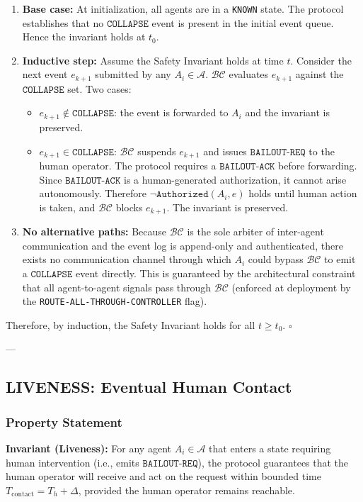 \begin{enumerate}
    \item \textbf{Base case:} At initialization, all agents are in a \texttt{KNOWN} state. The protocol establishes that no $\texttt{COLLAPSE}$ event is present in the initial event queue. Hence the invariant holds at $t_0$.
    \item \textbf{Inductive step:} Assume the Safety Invariant holds at time $t$. Consider the next event $e_{k+1}$ submitted by any $A_i \in \mathcal{A}$. $\mathcal{BC}$ evaluates $e_{k+1}$ against the $\texttt{COLLAPSE}$ set. Two cases:
    \begin{itemize}
        \item $e_{k+1} \notin \texttt{COLLAPSE}$: the event is forwarded to $A_i$ and the invariant is preserved.
        \item $e_{k+1} \in \texttt{COLLAPSE}$: $\mathcal{BC}$ suspends $e_{k+1}$ and issues $\texttt{BAILOUT-REQ}$ to the human operator. The protocol requires a $\texttt{BAILOUT-ACK}$ before forwarding. Since $\texttt{BAILOUT-ACK}$ is a human-generated authorization, it cannot arise autonomously. Therefore $\neg \texttt{Authorized}(A_i, e)$ holds until human action is taken, and $\mathcal{BC}$ blocks $e_{k+1}$. The invariant is preserved.
    \end{itemize}
    \item \textbf{No alternative paths:} Because $\mathcal{BC}$ is the sole arbiter of inter-agent communication and the event log is append-only and authenticated, there exists no communication channel through which $A_i$ could bypass $\mathcal{BC}$ to emit a $\texttt{COLLAPSE}$ event directly. This is guaranteed by the architectural constraint that all agent-to-agent signals pass through $\mathcal{BC}$ (enforced at deployment by the \texttt{ROUTE-ALL-THROUGH-CONTROLLER} flag).
\end{enumerate}

Therefore, by induction, the Safety Invariant holds for all $t \geq t_0$. $\square$

---

\subsection{LIVENESS: Eventual Human Contact}

\subsubsection{Property Statement}
\textbf{Invariant (Liveness):} For any agent $A_i \in \mathcal{A}$ that enters a state requiring human intervention (i.e., emits $\texttt{BAILOUT-REQ}$), the protocol guarantees that the human operator will receive and act on the request within bounded time $T_{\text{contact}} = T_h + \Delta$, provided the human operator remains reachable.

